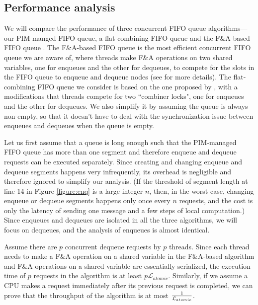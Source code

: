 \documentclass[11pt]{article}
\newcommand{\latato} {\mathcal{L}_{atomic}}
\begin{document}
\subsection{Performance analysis}
We will compare the performance of three concurrent FIFO queue algorithms---our PIM-manged FIFO queue, 
a flat-combining FIFO queue and the F\&A-based FIFO queue \cite{Morrison13}. 
The F\&A-based FIFO queue is the most efficient concurrent FIFO queue we are aware of, 
where threads make F\&A operations on two shared variables, 
one for enqueues and the other for dequeues, to compete for the slots in the FIFO queue to 
enqueue and dequeue nodes (see \cite{Morrison13} for more details). 
The flat-combining FIFO queue we consider is based on the one proposed by \cite{Hendler10}, 
with a modifications that threads compete for two ``combiner locks", 
one for enqueues and the other for dequeues. 
We also simplify it by assuming the queue is always non-empty, so that it doesn't have to deal with 
the synchronization issue between enqueues and dequeues when the queue is empty. 

Let us first assume that a queue is long enough such that the PIM-managed FIFO queue 
has more than one segment and therefore enqueue and dequeue requests can be executed separately. 
Since creating and changing enqueue and dequeue segments happens very infrequently, 
its overhead is negligible and therefore ignored to simplify our analysis.
(If the threshold of segment length at line 14 in Figure \ref{figure:enq} is a large integer $n$, 
then, in the worst case, changing enqueue or dequeue segments happens only once every $n$ requests, 
and the cost is only the latency of sending one message and a few steps of local computation.)
Since enqueues and dequeues are isolated in all the three algorithms, we will focus on dequeues, 
and the analysis of enqueues is almost identical. 

Assume there are $p$ concurrent dequeue requests by $p$ threads. 
Since each thread needs to make a F\&A operation on a shared variable in the F\&A-based algorithm and 
F\&A operations on a shared variable are essentially serialized, 
the execution time of $p$ requests in the algorithm is at least $p\latato$. 
Similarly, if we assume a CPU makes a request immediately after its previous request is completed, 
we can prove that the throughput of the algorithm is at most ${1 \over \latato}$.
\end{document}
